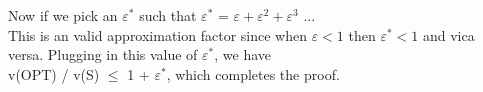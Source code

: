 \documentclass[11pt]{article}
\begin{document}
Now if we pick an $\varepsilon^*$  such that $\varepsilon^*$ =  $\varepsilon + \varepsilon^2 + \varepsilon^3$ ...\\
This is an valid approximation factor since when $\varepsilon < 1$ then $\varepsilon^*  < 1$ and vica versa. Plugging in this value of $\varepsilon^*$, we have \\

v(OPT) / v(S) $\leq$ 1 + $\varepsilon^*$, which completes the proof.
\end{document}
